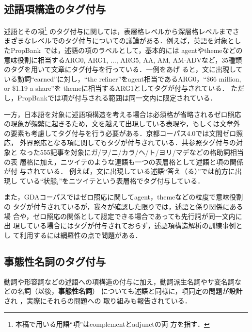 \documentclass[japanese]{jnlp_1.4}
\begin{document}
\subsection{述語項構造のタグ付与}
\label{ssec:pre_pred}

述語とその項\footnote{本稿で用いる用語``項''はcomplementとadjunctの両
  方を指す．} のタグ付与に関しては，表層格レベルから深層格レベルまでさ
まざまなレベルでのタグ付与についての議論がある．例えば，英語を対象とし
たPropBank~\cite{Palmer:05}では，述語の項のラベルとして，基本的には
agentやthemeなどの意味役割に相当するARG0, ARG1, $\dots$, ARG5, AA, AM,
AM-ADVなど，35種類のタグを用いて文章にタグ付与を行っている．一例をあげ
ると，文に出現している動詞``earned''に対し，``the
refiner''をagent相当であるARG0，``\$66 million, or \$1.19 a share''を
themeに相当するARG1としてタグが付与されている．
ただし，PropBankでは項が付与される範囲は同一文内に限定されている．

一方，日本語を対象に述語項構造を考える場合は必須格が省略されるゼロ照応
の現象が頻繁に起きるため，文を越えて出現している表現や，もしくは文章外
の要素も考慮してタグ付与を行う必要がある．京都コーパス4.0では文間ゼロ照応，
外界照応となる項に関してもタグが付与されている．共参照タグ付与の対象と
なった555記事を対象にガ/ヲ/ニ/カラ/ヘ/ト/ヨリ/マデなどの格助詞相当の表
層格に加え，ニツイテのような連語も一つの表層格として述語と項の関係が付
与されている．
例えば，文に出現している述語``答え（る）''では前方に出現し
ている``状態$_i$''をニツイテという表層格でタグ付与している．

また，GDAコーパスではゼロ照応に関してagent，themeなどの粒度で意味役割の
タグが付与されているが，我々が確認した限りでは，述語と係り関係にある場
合や，ゼロ照応の関係として認定できる場合であっても先行詞が同一文内に出
現している場合にはタグが付与されておらず，述語項構造解析の訓練事例とし
て利用するには網羅性の点で問題がある．



\subsection{事態性名詞のタグ付与}
\label{ssec:event_noun}

動詞や形容詞などの述語への項構造の付与に加え，動詞派生名詞やサ変名詞な
どの名詞（以後，\textbf{事態性名詞}）
についても述語と同様に，項同定の問題が設計され
\cite{Meyers:04,Hasida:05,Kawahara:02}，実際にそれらの問題への
取り組みも報告されている\cite{Jiang:06,Komachi:07,Liu:07}．
\end{document}
